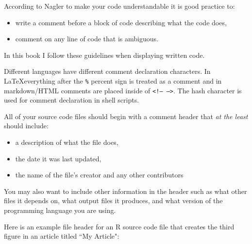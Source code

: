 According to Nagler \citeyearpar[491]{Nagler} to make your code understandable it is good practice to:

\begin{itemize}
    \item write a comment before a block of code describing what the code does,
    \item comment on any line of code that is ambiguous.
\end{itemize}

\noindent In this book I follow these guidelines when displaying written code. 

Different languages have different comment declaration characters. In \LaTeX everything after the {\tt{\%}} percent sign is treated as a comment and in markdown/HTML comments are placed inside of {\tt{\textless !-- --\textgreater}}. The hash character is used for comment declaration in shell scripts.

All of your source code files should begin with a comment header that {\emph{at the least}} should include:

\begin{itemize}
    \item a description of what the file does,
    \item the date it was last updated,
    \item the name of the file's creator and any other contributors
\end{itemize}

\noindent You may also want to include other information in the header such as what other files it depends on, what output files it produces, and what version of the programming language you are using. 

Here is an example file header for an R source code file that creates the third figure in an article titled ``My Article":

\begin{knitrout}
\color{fgcolor}\begin{kframe}
\begin{alltt}
\hlcomment{##################}
\hlcomment{##################}
\end{alltt}
\end{kframe}
\end{knitrout}


